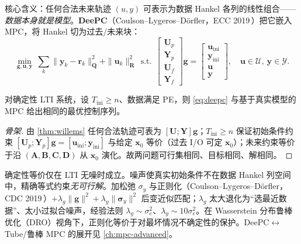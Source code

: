 核心含义：任何合法未来轨迹 $(u,y)$ 可表示为数据 Hankel 各列的线性组合——\emph{数据本身就是模型}。\textbf{DeePC}（Coulson--Lygeros--Dörfler，ECC 2019\,\cite{coulson2019deepc}）把它嵌入 MPC，将 Hankel 切为过去/未来块：
\begin{equation}
  \min_{\mathbf g,\mathbf u,\mathbf y}\ \sum_k\|\mathbf y_k-\mathbf r_k\|_{\mathbf Q}^2+\|\mathbf u_k\|_{\mathbf R}^2
  \ \ \text{s.t.}\ \
  \begin{bmatrix}\mathbf U_p\\\mathbf Y_p\\\mathbf U_f\\\mathbf Y_f\end{bmatrix}\mathbf g
  =\begin{bmatrix}\mathbf u_{\text{ini}}\\\mathbf y_{\text{ini}}\\\mathbf u\\\mathbf y\end{bmatrix},\quad
  \mathbf u\in\mathcal U,\ \mathbf y\in\mathcal Y.
  \label{eq:deepc}
\end{equation}

\begin{theorem}
\label{thm:deepc-mpc}
对确定性 LTI 系统，设 $T_{\text{ini}}\ge n$、数据满足 PE，则 \cref{eq:deepc} 与基于真实模型的 MPC 给出相同的最优控制序列。
\end{theorem}
\begin{proof}[骨架]
由 \cref{thm:willems} 任何合法轨迹可表为 $[\mathbf U;\mathbf Y]\mathbf g$；$T_{\text{ini}}\ge n$ 保证初始条件约束 $[\mathbf U_p;\mathbf Y_p]\mathbf g=[\mathbf u_{\text{ini}};\mathbf y_{\text{ini}}]$ 与给定 $\mathbf x_0$ 等价（过去 I/O 可定 $\mathbf x_0$）；未来约束等价于沿 $(\mathbf A,\mathbf B,\mathbf C,\mathbf D)$ 从 $\mathbf x_0$ 演化。故两问题可行集相同、目标相同、解相同。
\end{proof}

\begin{pitfall}[噪声下必须正则化]
确定性等价仅在 LTI 无噪时成立。噪声使真实初始条件不在数据 Hankel 列空间中，精确等式约束\emph{无可行解}。加松弛 $\sigma_y$ 与正则化（Coulson--Lygeros--Dörfler，CDC 2019\,\cite{coulson2019regularized}）$+\lambda_g\|\mathbf g\|^2+\lambda_y\|\boldsymbol\sigma_y\|^2$ 后变近似匹配；$\lambda_g$ 太大退化为“选最近数据”、太小过拟合噪声，经验法则 $\lambda_g\sim\sigma_e^2$、$\lambda_y\sim10\sigma_e^2$。在 Wasserstein 分布鲁棒优化（DRO）视角下，正则化等价于对最坏情况不确定性的保护。DeePC$\leftrightarrow$Tube/鲁棒 MPC 的展开见 \cref{ch:mpc-advanced}。
\end{pitfall}

